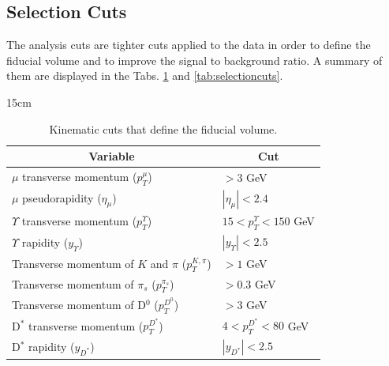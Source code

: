 \subsection{Selection Cuts} \label{sec:selcuts}

The analysis cuts are tighter cuts applied to the data in order to define the fiducial volume and to improve the signal to background ratio. A summary of them are displayed in the Tabs. \ref{tab:fiducialvol} and \ref{tab:selectioncuts}.

\begin{table}[!htbp]{15cm}
  \caption{Kinematic cuts that define the fiducial volume.}
  \begin{tabular}{ l | l }
    \hline
    \multicolumn{1}{c|}{Variable} & \multicolumn{1}{|c}{Cut} \\ \hline
    $\mu$ transverse momentum ($p_T^\mu$) & $> 3$ GeV \\ \hline
    $\mu$ pseudorapidity ($\eta_\mu$) & $|\eta_\mu| < 2.4$ \\ \hline
    $\Upsilon$ transverse momentum ($p_T^\Upsilon$) & $15 < p_T^\Upsilon < 150$ GeV \\ \hline
    $\Upsilon$ rapidity ($y_\Upsilon$) & $|y_\Upsilon| < 2.5$ \\ \hline
    Transverse momentum of $K$ and $\pi$ ($p_T^{K, \pi}$) & $> 1$ GeV \\ \hline
    Transverse momentum of $\pi_s$ ($p_T^{\pi_s}$) & $> 0.3$ GeV \\ \hline
    Transverse momentum of D$^0$ ($p_T^{D^0}$) & $> 3$ GeV\\ \hline
    D$^*$ transverse momentum ($p_T^{D^*}$) & $4 < p_T^{D^*} < 80$ GeV \\ \hline
    D$^*$ rapidity ($y_{D^*}$) & $|y_{D^*}| < 2.5$ \\ \hline
  \end{tabular}
  \label{tab:fiducialvol}
\end{table}

